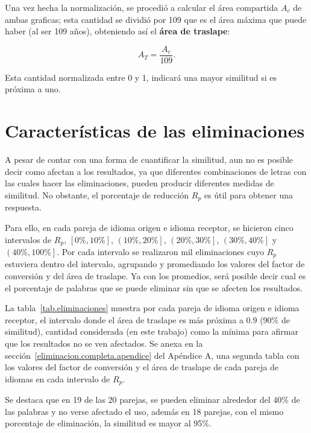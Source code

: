 Una vez hecha la normalización, se procedió a calcular el área compartida  $A_{c}$ de ambas graficas; esta cantidad se dividió por 109 que es el área máxima que puede haber (al ser 109 años), obteniendo así el \textbf{área de traslape}:

\begin{equation}
A_{T} = \frac{A_{c}}{109}.
\label{ec.atraslape}
\end{equation}

Esta cantidad normalizada entre 0 y 1, indicará una mayor similitud si es próxima a uno.

\section{Características de las eliminaciones}

A pesar de contar con una forma de cuantificar la similitud, aun no es posible decir como afectan a los resultados, ya que diferentes combinaciones de letras con las cuales hacer las eliminaciones, pueden producir diferentes medidas de similitud.  No obstante, el porcentaje de reducción $R_{p}$ es útil para obtener una respuesta.

Para ello, en cada pareja de idioma origen e idioma receptor, se hicieron cinco intervalos de $R_{p}$, $\left[0\%, 10\% \right]$, $\left( 10\%, 20\% \right]$, $\left( 20\%, 30\% \right]$, $\left( 30\%, 40\% \right]$ y $\left( 40\%, 100\% \right]$. Por cada intervalo se realizaron mil eliminaciones cuyo $R_{p}$ estuviera dentro del intervalo, agrupando y promediando los valores del factor de conversión y del área de traslape.  Ya con los promedios, será posible decir cual es el porcentaje de palabras que se puede eliminar sin que se afecten los resultados. 

La tabla~\ref{tab.eliminaciones} muestra por cada pareja de idioma origen e idioma receptor, el intervalo  donde el área de traslape es más próxima a 0.9 (90$\%$ de similitud), cantidad considerada (en este trabajo) como la mínima para afirmar que los resultados no se ven afectados.  Se anexa en la sección~\ref{eliminacion.completa.apendice} del Apéndice A, una segunda tabla con los valores del factor de conversión y el área de traslape de cada pareja de idiomas en cada intervalo de $R_{p}$.

Se destaca que en 19 de las 20 parejas, se pueden eliminar alrededor del $40\%$ de las palabras y
no verse afectado el uso, además en 18 parejas, con el mismo porcentaje de eliminación, la similitud es mayor al 95$\%$. 


